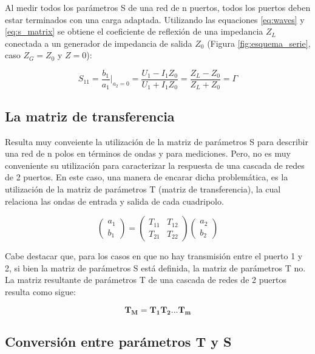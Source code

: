 Al medir todos los parámetros S de una red de n puertos, todos los puertos deben estar terminados con una carga adaptada.
Utilizando las equaciones \ref{eq:waves} y \ref{eq:s_matrix} se obtiene el coeficiente de reflexión de una impedancia $Z_L$
conectada a un generador de impedancia de salida $Z_0$ (Figura \ref{fig:esquema_serie}, caso $Z_G = Z_0$ y $Z = 0$):

\begin{equation}
S_{11} = \dfrac{b_1}{a_1}\bigg|_{a_2=0} = \dfrac{U_1 - I_1Z_0}{U_1 + I_1Z_0} = \dfrac{Z_L - Z_0}{Z_L + Z_0} = \Gamma 
\end{equation}


\subsection{La matriz de transferencia} \label{ssec:transMatrix}

Resulta muy conveiente la utilización de la matriz de parámetros S para describir una red de n polos en términos de ondas y 
para mediciones. Pero, no es muy conveniente su utilización para caracterizar la respuesta de una cascada de redes de 2 
puertos. En este caso, una manera de encarar dicha problemática, es la utilización de la matriz de parámetros T (matriz 
de transferencia), la cual relaciona las ondas de entrada y salida de cada cuadripolo.

\begin{equation}
\begin{pmatrix} a_1\\b_1 \end{pmatrix} = \begin{pmatrix} T_{11} & T_{12}\\T_{21} & T_{22} \end{pmatrix} 
\begin{pmatrix} a_2\\b_2 \end{pmatrix}
\end{equation}

Cabe destacar que, para los casos en que no hay transmisión entre el puerto 1 y 2, si bien la matriz de parámetros S está definida, 
la matriz de parámetros T no. La matriz resultante de parámetros T de una cascada de redes de 2 puertos resulta como sigue:

\begin{equation}
\mathbf{T_M=T_1T_2...T_m}
\end{equation}

\subsection{Conversión entre parámetros T y S} \label{ssec:conversion}

